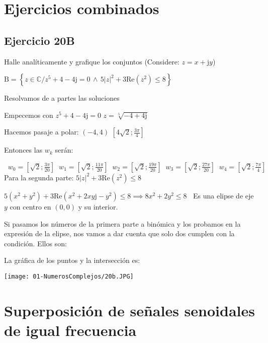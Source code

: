 \documentclass[11pt]{article}
\def\imj{\mathrm{j}}
\begin{document}
	\section{Ejercicios combinados}
	\subsection{Ejercicio 20B}
	Halle analíticamente y grafique los conjuntos (Considere: $z=x+\imj y$)
	
	$\mathrm{B}=\left\lbrace z\in\mathbb{C} / z^{5}+4-4\imj=0 \, \wedge \, 5\left|z\right|^{2}+3\mathrm{Re}\left(z^{2}\right) \leq 8 \right\rbrace$
	
	Resolvamos de a partes las soluciones
	
	Empecemos con $z^{5}+4-4\imj=0$ \textrightarrow $z=\sqrt[5]{-4+4\imj}$
	
	Hacemos pasaje a polar: $\left(-4, 4\right)$ \textrightarrow $\left[4\sqrt{2};\frac{3\pi}{4}\right]$
	
	Entonces las $w_{k}$ serán:
	
	$\boxed{\;\; w_{0}=\left[\sqrt{2}; \frac{3\pi}{20}\right] \;\; w_{1}=\left[\sqrt{2}; \frac{11\pi}{20}\right] \;\; w_{2}=\left[\sqrt{2}; \frac{19\pi}{20}\right] \;\; w_{3}=\left[\sqrt{2}; \frac{27\pi}{20}\right] \;\; w_{4}=\left[\sqrt{2}; \frac{7\pi}{4}\right] \;\;}$\vspace{0.5cm}\\
	
	Para la segunda parte: $5\left|z\right|^{2}+3\mathrm{Re}\left(z^{2}\right) \leq 8$
	
	$5\left(x^2+y^2\right)+3\mathrm{Re}\left(x^2+2xy\imj-y^2\right)\leq8\implies8x^2+2y^2\leq8\;\;$ Es una elipse de eje $y$ con centro en $\left(0,0\right)$ y su interior.
	
	Si pasamos los números de la primera parte a binómica y los probamos en la expresión de la elipse, nos vamos a dar cuenta que solo dos cumplen con la condición. Ellos son:
	
	
	La gráfica de los puntos y la intersección es:

	\begin{center}
		\texttt{[image: 01-NumerosComplejos/20b.JPG]}
	\end{center}
	\pagebreak
	\section{Superposición de señales senoidales de igual frecuencia}
\end{document}

